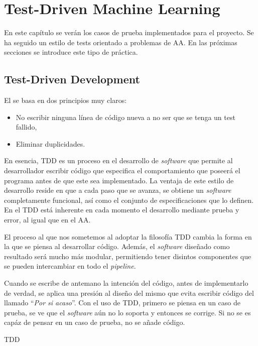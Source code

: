 \chapter{Test-Driven Machine Learning}
\label{ch:tdml}

En este capítulo se verán los casos de prueba implementados para el proyecto. Se
ha seguido un estilo de tests orientado a problemas de \ac{AA}. En las próximas
secciones se introduce este tipo de práctica.

\section{Test-Driven Development}
\label{sec:tdd}

El  se basa en dos principios muy claros:
\begin{itemize}
\item No escribir ninguna línea de código nueva a no ser que se tenga un test
  fallido,
\item Eliminar duplicidades.
\end{itemize}

En esencia, \ac{TDD} es un proceso en el desarrollo de \emph{software} que
permite al desarrollador escribir código que especifica el comportamiento que
poseerá el programa antes de que este sea implementado. La ventaja de este
estilo de desarrollo reside en que a cada paso que se avanza, se obtiene un
\emph{software} completamente funcional, así como el conjunto de
especificaciones que lo definen. En el \ac{TDD} está inherente en cada momento
el desarrollo mediante prueba y error, al igual que en el \ac{AA}.

El proceso al que nos sometemos al adoptar la filosofía \ac{TDD} cambia la forma
en la que se piensa al desarrollar código. Además, el \emph{software} diseñado
como resultado será mucho más modular, permitiendo tener disintos componentes
que se pueden intercambiar en todo el \emph{pipeline}.

Cuando se escribe de antemano la intención del código, antes de implementarlo de
verdad, se aplica una presión al diseño del mismo que evita escribir código del
llamado ``\emph{Por si acaso}''. Con el uso de \ac{TDD}, primero se piensa en un
caso de prueba, se ve que el \emph{software} aún no lo soporta y entonces se
corrige. Si no se es capáz de pensar en un caso de prueba, no se añade código.

\ac{TDD} 

